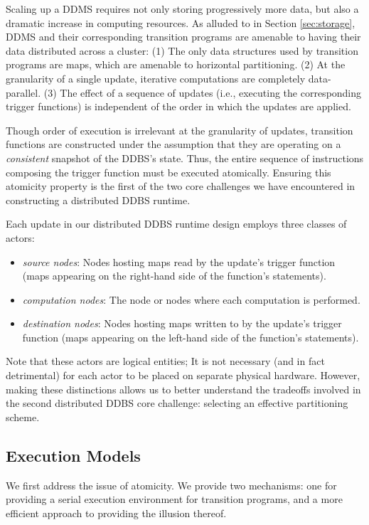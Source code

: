 Scaling up a DDMS requires not only storing progressively more data, but also a dramatic increase in computing resources.  As alluded to in Section \ref{sec:storage}, DDMS and their corresponding transition programs are amenable to having their data distributed across a cluster: (1) The only data structures used by transition programs are maps, which are amenable to horizontal partitioning.  (2) At the granularity of a single update, iterative computations are completely data-parallel.  (3) The effect of a sequence of updates (i.e., executing the corresponding trigger functions) is independent of the order in which the updates are applied.

Though order of execution is irrelevant at the granularity of updates, transition functions are constructed under the assumption that they are operating on a \textit{consistent} snapshot of the DDBS's state.    Thus, the entire sequence of instructions composing the trigger function must be executed atomically.  Ensuring this atomicity property is the first of the two core challenges we have encountered in constructing a distributed DDBS runtime.

Each update in our distributed DDBS runtime design employs three classes of actors:
\begin{itemize}
\item \textit{source nodes}: Nodes hosting maps read by the update's trigger function (maps appearing on the right-hand side of the function's statements).
\item \textit{computation nodes}: The node or nodes where each computation is performed.
\item \textit{destination nodes}: Nodes hosting maps written to by the update's trigger function (maps appearing on the left-hand side of the function's statements).
\end{itemize}
Note that these actors are logical entities; It is not necessary (and in fact detrimental) for each actor to be placed on separate physical hardware.  However, making these distinctions allows us to better understand the tradeoffs involved in the second distributed DDBS core challenge: selecting an effective partitioning scheme.  

\subsection{Execution Models}
We first address the issue of atomicity.  We provide two mechanisms: one for providing a serial execution environment for transition programs, and a more efficient approach to providing the illusion thereof.

